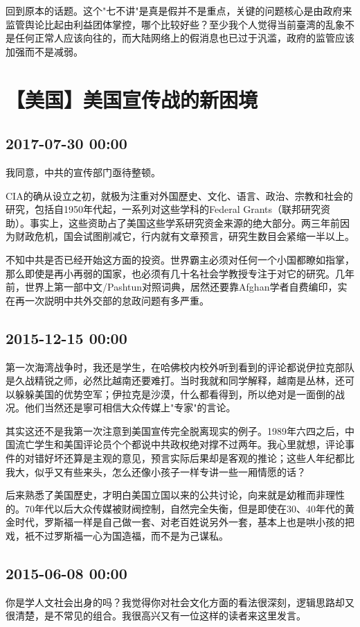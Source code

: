 \documentclass[twocolumn]{ctexart}
\begin{document}
回到原本的话题。这个"七不讲"是真是假并不是重点，关键的问题核心是由政府来监管舆论比起由利益团体掌控，哪个比较好些？至少我个人觉得当前臺湾的乱象不是任何正常人应该向往的，而大陆网络上的假消息也已过于汎滥，政府的监管应该加强而不是减弱。\section*{【美国】美国宣传战的新困境}
\subsection*{2017-07-30 00:00}
我同意，中共的宣传部门亟待整顿。

CIA的确从设立之初，就极为注重对外国歷史、文化、语言、政治、宗教和社会的研究，包括自1950年代起，一系列对这些学科的Federal Grants（联邦研究资助）。事实上，这些资助占了美国这些学系研究资金来源的绝大部分。两三年前因为财政危机，国会试图削减它，行内就有文章预言，研究生数目会紧缩一半以上。

不知中共是否已经开始这方面的投资。世界霸主必须对任何一个小国都瞭如指掌，那么即使是再小再弱的国家，也必须有几十名社会学教授专注于对它的研究。几年前，世界上第一部中文/Pashtun对照词典，居然还要靠Afghan学者自费编印，实在再一次説明中共外交部的怠政问题有多严重。\subsection*{2015-12-15 00:00}
第一次海湾战争时，我还是学生，在哈佛校内校外听到看到的评论都说伊拉克部队是久战精锐之师，必然比越南还要难打。当时我就和同学解释，越南是丛林，还可以躲躲美国的优势空军；伊拉克是沙漠，什么都看得到，所以绝对是一面倒的战况。他们当然还是寧可相信大众传媒上"专家"的言论。

其实这还不是我第一次注意到美国宣传完全脱离现实的例子。1989年六四之后，中国流亡学生和美国评论员个个都说中共政权绝对撑不过两年。我心里就想，评论事件的对错好坏还算是主观的意见，预言实际后果却是客观的推论；这些人年纪都比我大，似乎又有些来头，怎么还像小孩子一样专讲一些一厢情愿的话？

后来熟悉了美国歷史，才明白美国立国以来的公共讨论，向来就是幼稚而非理性的。70年代以后大众传媒被财阀控制，自然完全失衡，但是即使在30、40年代的黄金时代，罗斯福一样是自己做一套、对老百姓说另外一套，基本上也是哄小孩的把戏，衹不过罗斯福一心为国造福，而不是为己谋私。\subsection*{2015-06-08 00:00}
你是学人文社会出身的吗？我觉得你对社会文化方面的看法很深刻，逻辑思路却又很清楚，是不常见的组合。我很高兴又有一位这样的读者来这里发言。
\end{document}
